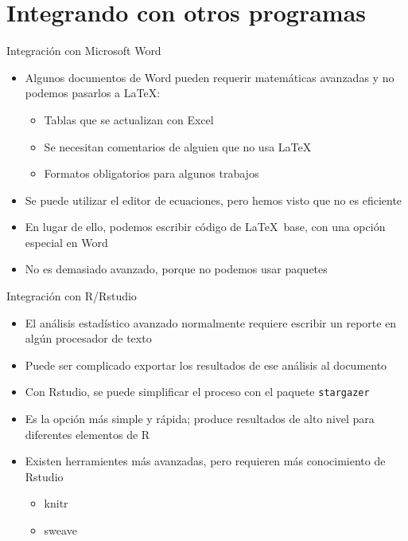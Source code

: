 \documentclass{beamer}
\begin{document}
\section{Integrando con otros programas}
\begin{frame}{Integración con Microsoft Word}
\begin{itemize}
    \item Algunos documentos de Word pueden requerir matemáticas avanzadas y no podemos pasarlos a \LaTeX:
    \begin{itemize}
        \item Tablas que se actualizan con Excel
        \item Se necesitan comentarios de alguien que no usa \LaTeX
        \item Formatos obligatorios para algunos trabajos
    \end{itemize}
    \item Se puede utilizar el editor de ecuaciones, pero hemos visto que no es eficiente
    \item En lugar de ello, podemos escribir código de \LaTeX \ base, con una opción especial en Word
    \item  No es demasiado avanzado, porque no podemos usar paquetes
    \end{itemize}
\end{frame}
\begin{frame}{Integración con R/Rstudio}
    \begin{itemize}
        \item El análisis estadístico avanzado normalmente requiere escribir un reporte en algún procesador de texto
        \item Puede ser complicado exportar los resultados de ese análisis al documento
        \item Con Rstudio, se puede simplificar el proceso con el paquete \texttt{stargazer}
        \item Es la opción más simple y rápida; produce resultados de alto nivel para diferentes elementos de R
        \item Existen herramientes más avanzadas, pero requieren más conocimiento de Rstudio
        \begin{itemize}
            \item \textsf{knitr}
            \item \textsf{sweave}
        \end{itemize}
    \end{itemize}
\end{frame}
\end{document}
